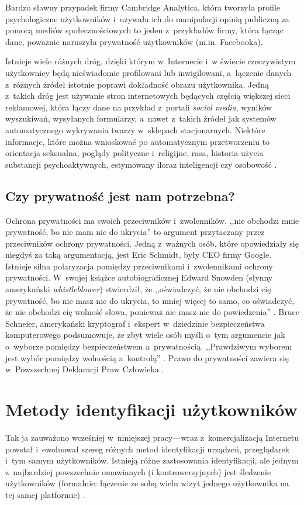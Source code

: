 Bardzo sławny przypadek firmy Cambridge Analytica, która tworzyła profile
psychologiczne użytkowników i~używała ich do manipulacji opinią publiczną za
pomocą mediów społecznościowych to jeden z~przykładów firmy, która łącząc dane,
poważnie naruszyła prywatność użytkowników (m.in. Facebooka).

Istnieje wiele różnych dróg, dzięki którym w~Internecie i~w świecie rzeczywistym
użytkownicy będą nieświadomie profilowani lub inwigilowani, a~łączenie danych
z~różnych źródeł istotnie poprawi dokładność obrazu użytkownika. Jedną z~takich
dróg jest używanie stron internetowych będących częścią większej sieci
reklamowej, która łączy dane na przykład z~portali \emph{social media}, wyników
wyszukiwań, wysyłanych formularzy, a~nawet z~takich źródeł jak systemów
automatycznego wykrywania twarzy w~sklepach stacjonarnych. Niektóre informacje,
które można wnioskować po automatycznym przetworzeniu to orientacja seksualna,
poglądy polityczne i~religijne, rasa, historia użycia substancji
psychoaktywnych, estymowany iloraz inteligencji czy osobowość
\cite{kosinski2013private}.

\subsection{Czy prywatność jest nam potrzebna?}
Ochrona prywatności ma swoich przeciwników i~zwolenników. ,,nie obchodzi mnie
prywatność, bo nie mam nic do ukrycia'' to argument przytaczany przez
przeciwników ochrony prywatności. Jedną z~ważnych osób, które opowiedziały się
niegdyś za taką argumentacją, jest Eric Schmidt, były CEO firmy Google. Istnieje
silna polaryzacja pomiędzy przeciwnikami i~zwolennikami ochrony prywatności.
W~swojej książce autobiograficznej Edward Snowden (słynny amerykański
\emph{whistleblower}) stwierdził, że ,,oświadczyć, że nie obchodzi cię
prywatność, bo nie masz nic do ukrycia, to mniej więcej to samo, co oświadczyć,
że nie obchodzi cię wolność słowa, ponieważ nie masz nic do powiedzenia''
\cite{snowden2019pamiec}. Bruce Schneier, amerykański kryptograf i~ekspert
w~dziedzinie bezpieczeństwa komputerowego podsumowuje, że zbyt wiele osób myśli
o~tym argumencie jak o~wyborze pomiędzy bezpieczeństwem a~prywatnością.
,,Prawdziwym wyborem jest wybór pomiędzy wolnością a~kontrolą''
\cite{schneier2006eternal}. Prawo do prywatności zawiera się w~Powszechnej
Deklaracji Praw Człowieka \cite{united1949universal}.

\section{Metody identyfikacji użytkowników}
Tak ja zauważono wcześniej w~niniejszej pracy---wraz z~komercjalizacją Internetu
powstał i~ewoluował szereg różnych metod identyfikacji urządzeń, przeglądarek
i~tym samym użytkowników. Istnieją różne zastosowania identyfikacji, ale jednym
z~najbardziej powszechnie omawianych (i kontrowersyjnych) jest śledzenie
użytkowników (formalnie: łączenie ze sobą wielu wizyt jednego użytkownika na tej
samej platformie) \cite[s. 3]{al2020too}.

